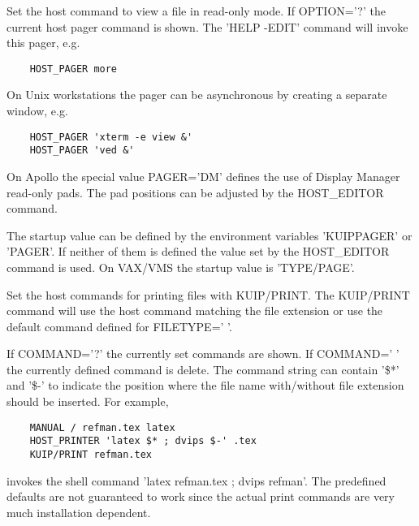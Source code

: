 \ENDCMD


\BEGARG
{}
\ENDARG

   \par
Set the host command to view a file in read-only mode.  If OPTION='?' the 
   current host pager command is shown.  The 'HELP -EDIT' command will invoke 
   this pager, e.g.  
\begin{verbatim}
    HOST_PAGER more
\end{verbatim}
\ENDVERB
   \par
On Unix workstations the pager can be asynchronous by creating a separate 
   window, e.g.  
\begin{verbatim}
    HOST_PAGER 'xterm -e view &'
    HOST_PAGER 'ved &'
\end{verbatim}
\ENDVERB
   \par
On Apollo the special value PAGER='DM' defines the use of Display Manager 
   read-only pads.  The pad positions can be adjusted by the HOST_EDITOR 
   command.  

   \par
The startup value can be defined by the environment variables 'KUIPPAGER' 
   or 'PAGER'.  If neither of them is defined the value set by the 
   HOST_EDITOR command is used.  On VAX/VMS the startup value is 'TYPE/PAGE'. 

\ENDCMD


\BEGARG
{}
\ENDARG

   \par
Set the host commands for printing files with KUIP/PRINT.  The KUIP/PRINT 
   command will use the host command matching the file extension or use the 
   default command defined for FILETYPE=' '.  

   \par
If COMMAND='?' the currently set commands are shown.  If COMMAND=' ' the 
   currently defined command is delete.  The command string can contain '\$*' 
   and '\$-' to indicate the position where the file name with/without file 
   extension should be inserted.  For example, 
\begin{verbatim}
    MANUAL / refman.tex latex
    HOST_PRINTER 'latex $* ; dvips $-' .tex
    KUIP/PRINT refman.tex
\end{verbatim}
   \par
invokes the shell command 'latex refman.tex ; dvips refman'.  The 
   predefined defaults are not guaranteed to work since the actual print 
   commands are very much installation dependent.  

